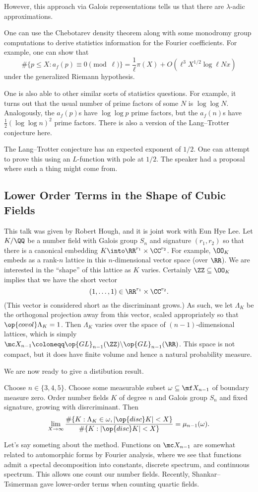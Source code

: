 \documentclass{article}
\begin{document}
However, this approach via Galois representations tells us that there are $\lambda$-adic approximations.
\begin{example}
	One can use the Chebotarev density theorem along with some monodromy group computations to derive statistics information for the Fourier coefficients. For example, one can show that
	\[\#\{p\le X:a_f(p)\equiv0\pmod\ell\}=\frac1\ell\pi(X)+O\left(\ell^3X^{1/2}\log\ell Nx\right)\]
	under the generalized Riemann hypothesis.
\end{example}
One is also able to other similar sorts of statistics questions. For example, it turns out that the usual number of prime factors of some $N$ is $\log\log N$. Analogously, the $a_f(p)$s have $\log\log p$ prime factors, but the $a_f(n)$s have $\frac12(\log\log n)^2$ prime factors. There is also a version of the Lang--Trotter conjecture here.
\begin{remark}
	The Lang--Trotter conjecture has an expected exponent of $1/2$. One can attempt to prove this using an $L$-function with pole at $1/2$. The speaker had a proposal where such a thing might come from.
\end{remark}

\subsection{Lower Order Terms in the Shape of Cubic Fields}
This talk was given by Robert Hough, and it is joint work with Eun Hye Lee. Let $K/\QQ$ be a number field with Galois group $S_n$ and signature $(r_1,r_2)$ so that there is a canonical embedding $K\into\RR^{r_1}\times\CC^{r_2}$. For example, $\OO_K$ embeds as a rank-$n$ lattice in this $n$-dimensional vector space (over $\RR$). We are interested in the ``shape'' of this lattice as $K$ varies. Certainly $\ZZ\subseteq\OO_K$ implies that we have the short vector
\[(1,\ldots,1)\in\RR^{r_1}\times\CC^{r_2}.\]
(This vector is considered short as the discriminant grows.) As such, we let $\Lambda_K$ be the orthogonal projection away from this vector, scaled appropriately so that $\op{covol}\Lambda_K=1$. Then $\Lambda_K$ varies over the space of $(n-1)$-dimensional lattices, which is simply $\mc X_{n-1}\coloneqq\op{GL}_{n-1}(\ZZ)\backslash\op{GL}_{n-1}(\RR)$. This space is not compact, but it does have finite volume and hence a natural probability measure.

We are now ready to give a distibution result.
\begin{theorem}
	Choose $n\in\{3,4,5\}$. Choose some measurable subset $\omega\subseteq\mf X_{n-1}$ of boundary measure zero. Order number fields $K$ of degree $n$ and Galois group $S_n$ and fixed signature, growing with disrcriminant. Then
	\[\lim_{X\to\infty}\frac{\#\{K:\Lambda_K\in\omega,\left|\op{disc}K\right|<X\}}{\#\{K:\left|\op{disc}K\right|<X\}}=\mu_{n-1}(\omega).\]
\end{theorem}
Let's say someting about the method. Functions on $\mc X_{n-1}$ are somewhat related to automorphic forms by Fourier analysis, where we see that functions admit a spectal decomposition into constants, discrete spectrum, and continuous spectrum. This allows one count our number fields. Recently, Shankar--Tsimerman gave lower-order terms when counting quartic fields.
\end{document}
